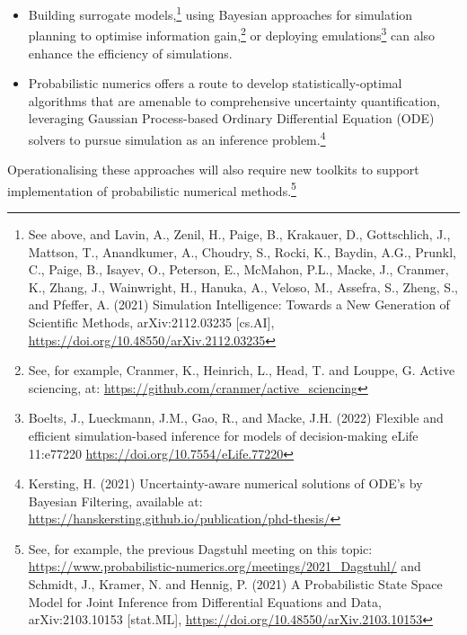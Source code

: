 {\begin{itemize}
{    \uline{\url{https://doi.org/10.48550/arXiv.1903.00007}}}
\item
  Building surrogate models,\footnote{See above, and Lavin, A., Zenil,
    H., Paige, B., Krakauer, D., Gottschlich, J., Mattson, T.,
    Anandkumer, A., Choudry, S., Rocki, K., Baydin, A.G., Prunkl, C.,
    Paige, B., Isayev, O., Peterson, E., McMahon, P.L., Macke, J.,
    Cranmer, K., Zhang, J., Wainwright, H., Hanuka, A., Veloso, M.,
    Assefra, S., Zheng, S., and Pfeffer, A. (2021) Simulation
    Intelligence: Towards a New Generation of Scientific Methods,
    arXiv:2112.03235 {[}cs.AI{]},
    \href{https://doi.org/10.48550/arXiv.2112.03235}{\hfill\break
    \uline{https://doi.org/10.48550/arXiv.2112.03235}}} using Bayesian
  approaches for simulation planning to optimise information
  gain,\footnote{See, for example, Cranmer, K., Heinrich, L., Head, T.
    and Louppe, G. Active sciencing, at:
    \href{https://github.com/cranmer/active_sciencing}{\uline{https://github.com/cranmer/active\_sciencing}}}
  or deploying emulations\footnote{Boelts, J., Lueckmann, J.M., Gao, R.,
    and Macke, J.H. (2022) Flexible and efficient simulation-based
    inference for models of decision-making eLife 11:e77220
    \href{https://doi.org/10.7554/eLife.77220}{\uline{https://doi.org/10.7554/eLife.77220}}}
  can also enhance the efficiency of simulations.
\item
  Probabilistic numerics offers a route to develop statistically-optimal
  algorithms that are amenable to comprehensive uncertainty
  quantification, leveraging Gaussian Process-based Ordinary
  Differential Equation (ODE) solvers to pursue simulation as an
  inference problem.\footnote{Kersting, H. (2021) Uncertainty-aware
    numerical solutions of ODE's by Bayesian Filtering, available at:
    \href{https://hanskersting.github.io/publication/phd-thesis/}{\uline{https://hanskersting.github.io/publication/phd-thesis/}}}
\end{itemize}

Operationalising these approaches will also require new toolkits to
support implementation of probabilistic numerical methods.\footnote{See,
  for example, the previous Dagstuhl meeting on this topic:
  \href{https://www.probabilistic-numerics.org/meetings/2021_Dagstuhl/}{\uline{https://www.probabilistic-numerics.org/meetings/2021\_Dagstuhl/}}
  and Schmidt, J., Kramer, N. and Hennig, P. (2021) A Probabilistic
  State Space Model for Joint Inference from Differential Equations and
  Data, arXiv:2103.10153 {[}stat.ML{]},
  \href{https://doi.org/10.48550/arXiv.2103.10153}{\uline{https://doi.org/10.48550/arXiv.2103.10153}}}

}
